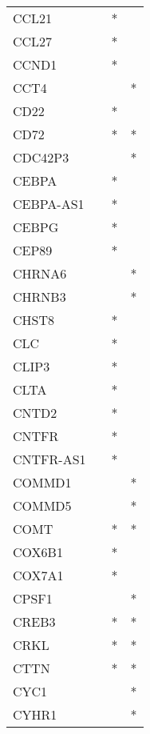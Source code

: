 \begin{longtable}{lccc}
CCL21        &           &   * &         \\
CCL27        &           &   * &         \\
CCND1        &           &   * &         \\
CCT4         &           &     &       * \\
CD22         &           &   * &         \\
CD72         &           &   * &       * \\
CDC42P3      &           &     &       * \\
CEBPA        &           &   * &         \\
CEBPA-AS1    &           &   * &         \\
CEBPG        &           &   * &         \\
CEP89        &           &   * &         \\
CHRNA6       &           &     &       * \\
CHRNB3       &           &     &       * \\
CHST8        &           &   * &         \\
CLC          &           &   * &         \\
CLIP3        &           &   * &         \\
CLTA         &           &   * &         \\
CNTD2        &           &   * &         \\
CNTFR        &           &   * &         \\
CNTFR-AS1    &           &   * &         \\
COMMD1       &           &     &       * \\
COMMD5       &           &     &       * \\
COMT         &           &   * &       * \\
COX6B1       &           &   * &         \\
COX7A1       &           &   * &         \\
CPSF1        &           &     &       * \\
CREB3        &           &   * &       * \\
CRKL         &           &   * &       * \\
CTTN         &           &   * &       * \\
CYC1         &           &     &       * \\
CYHR1        &           &     &       * \\

\end{longtable}
